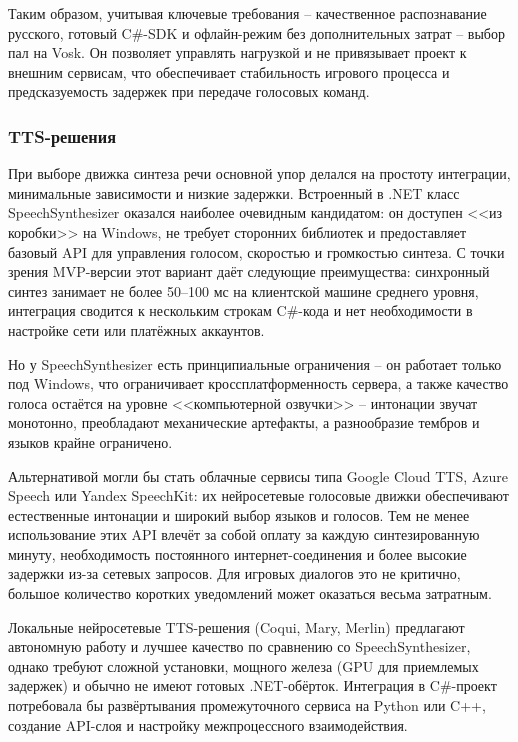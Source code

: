         Таким образом, учитывая ключевые требования -- качественное распознавание русского, готовый C\#-SDK и офлайн-режим без дополнительных затрат -- выбор пал на Vosk. 
        Он позволяет управлять нагрузкой и не привязывает проект к внешним сервисам, что обеспечивает стабильность игрового процесса и предсказуемость задержек при передаче голосовых команд.

        \subsubsection{TTS-решения}

        При выборе движка синтеза речи основной упор делался на простоту интеграции, минимальные зависимости и низкие задержки. Встроенный в .NET класс 
        SpeechSynthesizer оказался наиболее очевидным кандидатом: он доступен <<из коробки>> на Windows, не требует сторонних библиотек и предоставляет базовый API для управления голосом, 
        скоростью и громкостью синтеза. С точки зрения MVP-версии этот вариант даёт следующие преимущества: синхронный синтез занимает не более 50–100 мс на клиентской машине среднего уровня, 
        интеграция сводится к нескольким строкам C\#-кода и нет необходимости в настройке сети или платёжных аккаунтов.

        Но у SpeechSynthesizer есть принципиальные ограничения -- он работает только под Windows, что ограничивает кроссплатформенность сервера, а также качество голоса остаётся на 
        уровне <<компьютерной озвучки>> -- интонации звучат монотонно, преобладают механические артефакты, а разнообразие тембров и языков крайне 
        ограничено.

        Альтернативой могли бы стать облачные сервисы типа Google Cloud TTS, Azure Speech или Yandex SpeechKit: их нейросетевые голосовые движки обеспечивают естественные интонации и 
        широкий выбор языков и голосов. Тем не менее использование этих API влечёт за собой оплату за каждую синтезированную минуту, необходимость постоянного интернет-соединения 
        и более высокие задержки из-за сетевых запросов. Для игровых диалогов это не критично, большое количество коротких уведомлений может оказаться весьма затратным.

        Локальные нейросетевые TTS-решения (Coqui, Mary, Merlin) предлагают автономную работу и лучшее качество по сравнению со SpeechSynthesizer, однако требуют 
        сложной установки, мощного железа (GPU для приемлемых задержек) и обычно не имеют готовых .NET-обёрток. Интеграция в C\#-проект потребовала бы развёртывания промежуточного 
        сервиса на Python или C++, создание API-слоя и настройку межпроцессного взаимодействия.

